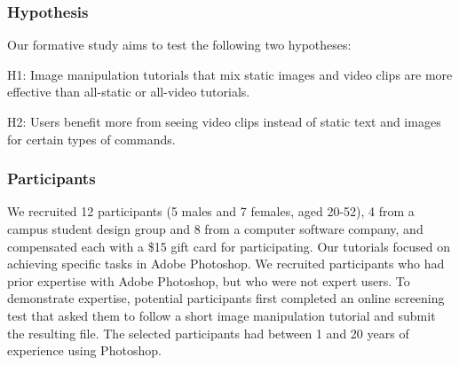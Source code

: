 \subsubsection{Hypothesis}
Our formative study aims to test the following two hypotheses:

H1: Image manipulation tutorials that mix static images and video clips are more effective than all-static or all-video tutorials.

H2: Users benefit more from seeing video clips instead of static text and images for certain types of commands.

\subsubsection{Participants}
We recruited 12 participants (5 males and 7 females, aged 20-52), 4 from a campus student design group and 8 from a computer software company, and compensated each with a \$15 gift card for participating. Our tutorials focused on achieving specific tasks in Adobe Photoshop. We recruited participants who had prior expertise with Adobe Photoshop, but who were not expert users. To demonstrate expertise, potential participants first completed an online screening test that asked them to follow a short image manipulation tutorial and submit the resulting file. The selected participants had between 1 and 20 years of experience using Photoshop.

